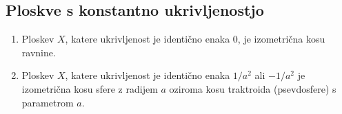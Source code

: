 \subsection{Ploskve s konstantno ukrivljenostjo}
\begin{izrek}
\label{izr_klasifikacija_ploskev_z_ukrivljenostjo_0}\begin{enumerate}
    \item Ploskev $X$, katere ukrivljenost je identično enaka $0$, je izometrična kosu ravnine.
    \item Ploskev $X$, katere ukrivljenost je identično enaka $1 / a^2$ ali $- 1 / a^2$ je izometrična kosu sfere z radijem $a$ oziroma
    kosu traktroida (psevdosfere) s parametrom $a$.
 \end{enumerate}
\end{izrek}

